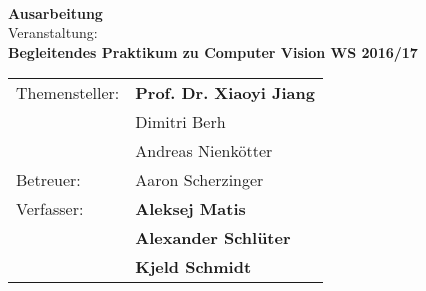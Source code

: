 \thispagestyle{empty}
\vspace*{2cm}
\begin{center}
\Large
\textbf{\inserttitle}\\
\normalsize
\vspace*{1cm}
\textbf{Ausarbeitung}\\
\vspace*{1cm}
Veranstaltung:\\
\textbf{Begleitendes Praktikum zu Computer Vision WS 2016/17}
\end{center}
\vfill

\begin{center}
\begin{tabular}{ll}
Themensteller:&\textbf{Prof. Dr. Xiaoyi Jiang}\\
&Dimitri Berh\\
&Andreas Nienkötter\\
Betreuer:&Aaron Scherzinger\\
Verfasser:&\textbf{Aleksej Matis}\\
&\textbf{Alexander Schlüter}\\
&\textbf{Kjeld Schmidt}
\end{tabular} 
\end{center}